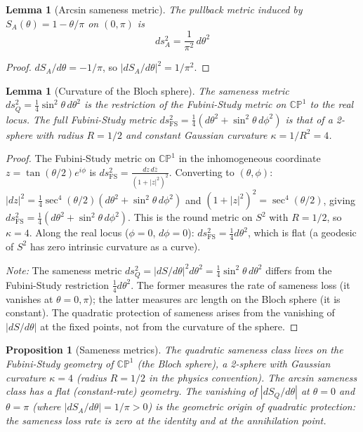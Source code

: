 \documentclass[11pt,letterpaper]{article}
\newtheorem{lemma}[theorem]{Lemma}
\newtheorem{proposition}[theorem]{Proposition}
\begin{document}
\begin{lemma}[Arcsin sameness metric]\label{lem:metricA}
The pullback metric induced by $S_A(\theta) = 1 - \theta/\pi$ on $(0, \pi)$ is
\begin{equation}
ds^2_A = \frac{1}{\pi^2}\,d\theta^2
\end{equation}
\end{lemma}

\begin{proof}
$dS_A/d\theta = -1/\pi$, so $|dS_A/d\theta|^2 = 1/\pi^2$.
\end{proof}

\begin{lemma}[Curvature of the Bloch sphere]\label{lem:curvQ}
The sameness metric $ds^2_Q = \tfrac{1}{4}\sin^2\theta\,d\theta^2$ is the restriction of the Fubini-Study metric on $\mathbb{CP}^1$ to the real locus. The full Fubini-Study metric $ds^2_{\text{FS}} = \tfrac{1}{4}(d\theta^2 + \sin^2\theta\,d\phi^2)$ is that of a 2-sphere with radius $R = 1/2$ and constant Gaussian curvature $\kappa = 1/R^2 = 4$.
\end{lemma}

\begin{proof}
The Fubini-Study metric on $\mathbb{CP}^1$ in the inhomogeneous coordinate $z = \tan(\theta/2)e^{i\phi}$ is $ds^2_{\text{FS}} = \frac{dz\,d\bar{z}}{(1 + |z|^2)^2}$. Converting to $(\theta, \phi)$: $|dz|^2 = \tfrac{1}{4}\sec^4(\theta/2)(d\theta^2 + \sin^2\theta\,d\phi^2)$ and $(1 + |z|^2)^2 = \sec^4(\theta/2)$, giving $ds^2_{\text{FS}} = \tfrac{1}{4}(d\theta^2 + \sin^2\theta\,d\phi^2)$. This is the round metric on $S^2$ with $R = 1/2$, so $\kappa = 4$. Along the real locus ($\phi = 0$, $d\phi = 0$): $ds^2_{\text{FS}} = \tfrac{1}{4}d\theta^2$, which is flat (a geodesic of $S^2$ has zero intrinsic curvature as a curve).

\emph{Note:} The sameness metric $ds^2_Q = |dS/d\theta|^2 d\theta^2 = \tfrac{1}{4}\sin^2\theta\,d\theta^2$ differs from the Fubini-Study restriction $\tfrac{1}{4}d\theta^2$. The former measures the rate of sameness loss (it vanishes at $\theta = 0, \pi$); the latter measures arc length on the Bloch sphere (it is constant). The quadratic protection of sameness arises from the vanishing of $|dS/d\theta|$ at the fixed points, not from the curvature of the sphere.
\end{proof}

\begin{proposition}[Sameness metrics]\label{prop:metrics}
The quadratic sameness class lives on the Fubini-Study geometry of $\mathbb{CP}^1$ (the Bloch sphere), a 2-sphere with Gaussian curvature $\kappa = 4$ (radius $R = 1/2$ in the physics convention). The arcsin sameness class has a flat (constant-rate) geometry. The vanishing of $|dS_Q/d\theta|$ at $\theta = 0$ and $\theta = \pi$ (where $|dS_A/d\theta| = 1/\pi > 0$) is the geometric origin of quadratic protection: the sameness loss rate is zero at the identity and at the annihilation point.
\end{proposition}
\end{document}
